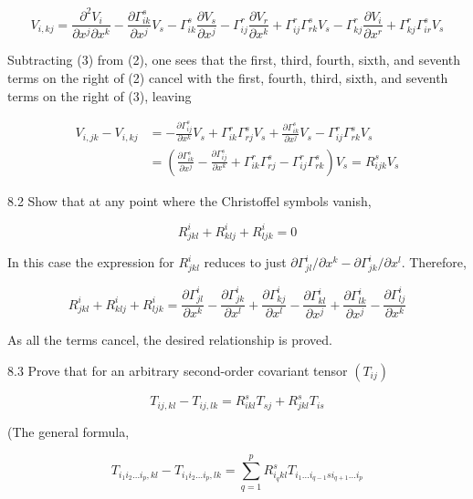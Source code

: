 \documentclass[10pt]{article}
\begin{document}
\begin{equation*}
V_{i, k j}=\frac{\partial^{2} V_{i}}{\partial x^{j} \partial x^{k}}-\frac{\partial \Gamma_{i k}^{s}}{\partial x^{j}} V_{s}-\Gamma_{i k}^{s} \frac{\partial V_{s}}{\partial x^{j}}-\Gamma_{i j}^{r} \frac{\partial V_{r}}{\partial x^{k}}+\Gamma_{i j}^{r} \Gamma_{r k}^{s} V_{s}-\Gamma_{k j}^{r} \frac{\partial V_{i}}{\partial x^{r}}+\Gamma_{k j}^{r} \Gamma_{i r}^{s} V_{s} \tag{3}
\end{equation*}


Subtracting (3) from (2), one sees that the first, third, fourth, sixth, and seventh terms on the right of (2) cancel with the first, fourth, third, sixth, and seventh terms on the right of (3), leaving

$$
\begin{aligned}
V_{i, j k}-V_{i, k j} & =-\frac{\partial \Gamma_{i j}^{s}}{\partial x^{k}} V_{s}+\Gamma_{i k}^{r} \Gamma_{r j}^{s} V_{s}+\frac{\partial \Gamma_{i k}^{s}}{\partial x^{j}} V_{s}-\Gamma_{i j}^{r} \Gamma_{r k}^{s} V_{s} \\
& =\left(\frac{\partial \Gamma_{i k}^{s}}{\partial x^{j}}-\frac{\partial \Gamma_{i j}^{s}}{\partial x^{k}}+\Gamma_{i k}^{r} \Gamma_{r j}^{s}-\Gamma_{i j}^{r} \Gamma_{r k}^{s}\right) V_{s}=R_{i j k}^{s} V_{s}
\end{aligned}
$$

8.2 Show that at any point where the Christoffel symbols vanish,

$$
R_{j k l}^{i}+R_{k l j}^{i}+R_{l j k}^{i}=0
$$

In this case the expression for $R_{j k l}^{i}$ reduces to just $\partial \Gamma_{j l}^{i} / \partial x^{k}-\partial \Gamma_{j k}^{i} / \partial x^{l}$. Therefore,

$$
R_{j k l}^{i}+R_{k l j}^{i}+R_{l j k}^{i}=\frac{\partial \Gamma_{j l}^{i}}{\partial x^{k}}-\frac{\partial \Gamma_{j k}^{i}}{\partial x^{l}}+\frac{\partial \Gamma_{k j}^{i}}{\partial x^{l}}-\frac{\partial \Gamma_{k l}^{i}}{\partial x^{j}}+\frac{\partial \Gamma_{l k}^{i}}{\partial x^{j}}-\frac{\partial \Gamma_{l j}^{i}}{\partial x^{k}}
$$

As all the terms cancel, the desired relationship is proved.

8.3 Prove that for an arbitrary second-order covariant tensor $\left(T_{i j}\right)$

$$
T_{i j, k l}-T_{i j, l k}=R_{i k l}^{s} T_{s j}+R_{j k l}^{s} T_{i s}
$$

(The general formula,


\begin{equation*}
T_{i_{1} i_{2} \ldots i_{p}, k l}-T_{i_{1} i_{2} \ldots i_{p}, l k}=\sum_{q=1}^{p} R_{i_{q} k l}^{s} T_{i_{1} \ldots i_{q-1} s i_{q+1} \ldots i_{p}} \tag{8.18}
\end{equation*}
\end{document}
